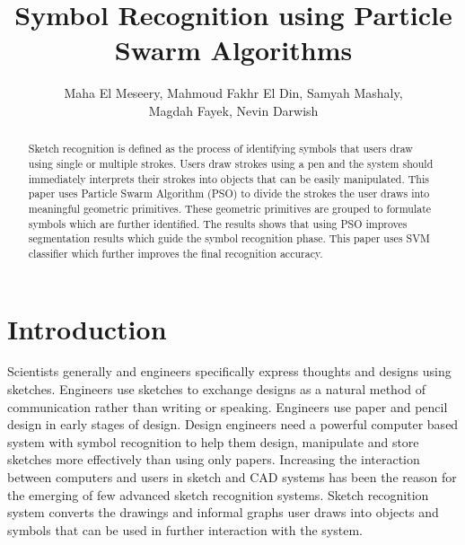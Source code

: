 \documentclass[a4paper,10pt]{IEEEconf}
\title{Symbol Recognition using Particle Swarm Algorithms}
\author{Maha El Meseery,  Mahmoud Fakhr El Din,  Samyah Mashaly,
\\  Magdah Fayek,  Nevin Darwish}
\begin{document}
\maketitle
\begin{abstract}
Sketch recognition is defined as the process of identifying symbols that users draw using single or multiple strokes. Users draw strokes using a pen and the system should immediately interprets their strokes into objects that can be easily manipulated. This paper uses Particle Swarm Algorithm (PSO) to divide the strokes the user draws into meaningful geometric primitives. These geometric primitives are grouped to formulate symbols which are further identified. The results shows that using PSO improves segmentation results which guide the symbol recognition phase. This paper uses SVM classifier which  further improves the final recognition accuracy.  %
\end{abstract}
\section{Introduction}
Scientists generally and engineers specifically express thoughts and designs using sketches. Engineers use sketches to exchange designs as a natural method of communication rather than writing or speaking. Engineers use paper and pencil design in early stages of design. Design engineers need a powerful computer based system with symbol recognition to help them design, manipulate and store sketches more effectively than using only papers.  Increasing the interaction between computers and users in sketch and CAD systems has been the reason for the emerging of few advanced sketch recognition systems. Sketch recognition system converts the drawings and informal graphs user draws into objects and symbols that can be used in further interaction with the system. 
\end{document}

